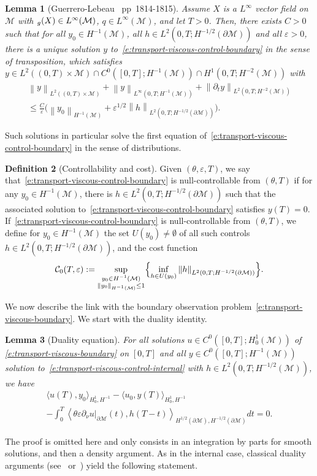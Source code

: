 \documentclass[JEP,XML,SOM,Unicode]{cedram}
\newtheorem{lemma}{Lemma}[section]
\theoremstyle{definition}
\newtheorem{definition}[lemma]{Definition}
\newcommand{\M}{\ensuremath{\mathcal M}}
\let \div \relax
\DeclareMathOperator{\div}{div}
\newcommand\nor[2]{\left\|#1\right\|_{#2}}
\let\d\partial
\let\eps\varepsilon
\begin{document}
\begin{lemma}[Guerrero-Lebeau~\cite{GL:07} pp~1814-1815]
Assume $X$ is a $L^\infty$ vector field on $\M$ with $\div_{g}(X) \in L^\infty(\M)$, $q \in L^\infty(\M)$, and let $T>0$. Then, there exists $C>0$ such that for all $y_0 \in H^{-1}(\M)$, all $h \in L^2(0,T ; H^{-1/2}(\d\M))$ and all $\eps>0$, there is a unique solution $y$ to~\eqref{e:transport-viscous-control-boundary} in the sense of transposition, which satisfies $y \in L^2((0,T)\times \M) \cap C^0([0,T]; H^{-1}(\M)) \cap H^1(0,T ; H^{-2}(\M))$ with
\begin{multline*}
\nor{y}{L^2((0,T)\times \M)} + \nor{y}{L^\infty(0,T; H^{-1}(\M))} + \nor{\d_t y}{L^2(0,T ; H^{-2}(\M))} \\
\leq \frac{C}{\eps} \bigl( \nor{y_0}{H^{-1}(\M)}+ \eps^{1/2} \nor{h}{L^2(0,T ; H^{-1/2}(\d\M))}\bigr).
\end{multline*}
\end{lemma}
Such solutions in particular solve the first equation of~\eqref{e:transport-viscous-control-boundary} in the sense of distributions.
\begin{definition}[Controllability and cost]
Given $(\theta, \eps, T)$, we say that~\eqref{e:transport-viscous-control-boundary} is null-controllable from $(\theta, T)$ if for any $y_0 \in H^{-1}(\M)$, there is $h \in L^2(0,T; H^{-1/2}(\d\M))$ such that the associated solution to~\eqref{e:transport-viscous-control-boundary} satisfies $y(T) =0$.
If~\eqref{e:transport-viscous-control-boundary} is null-controllable from $(\theta, T)$, we define for $y_0 \in H^{-1}(\M)$ the set $U(y_0) \neq \emptyset$ of all such controls $h \in L^2(0,T; H^{-1/2}(\d\M))$, and the cost function
\[
\mathcal{C}_0(T,\eps) := \sup_{\substack{y_0 \in H^{-1}(\M)\\ \nor{y_0}{H^{-1}(\M)}\leq 1}} \Bigl\{\inf_{h \in U(y_0)} \nor{h}{L^2(0,T; H^{-1/2}(\d\M))} \Bigr\}.
\]
\end{definition}

We now describe the link with the boundary observation problem~\eqref{e:transport-viscous-boundary}.
We start with the duality identity.
\begin{lemma}[Duality equation]
For all solutions $u \in C^0([0,T]; H^1_0(\M))$ of \eqref{e:transport-viscous-boundary} on $[0,T]$ and all $y\in C^0([0,T]; H^{-1}(\M))$ solution to~\eqref{e:transport-viscous-control-internal} with $h \in L^2(0,T; H^{-1/2}(\M))$, we have
\begin{multline*}
\langle u(T), y_0\rangle_{H^1_0, H^{-1}} - \langle u_0, y(T)\rangle_{H^1_0, H^{-1}} \\
- \int_0^T \left\langle \theta \eps \d_{\nu}u|_{\d\M}(t), h(T-t) \right\rangle_{H^{1/2}(\d\M),H^{-1/2}(\d\M)} dt =0.
\end{multline*}
\end{lemma}
The proof is omitted here and only consists in an integration by parts for smooth solutions, and then a density argument.
As in the internal case, classical duality arguments (see~\cite{DR:77} or~\cite[Chap.\,2.3]{Cor:book}) yield the following statement.
\end{document}
